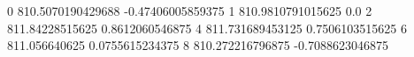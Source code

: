 0 810.5070190429688 -0.47406005859375
1 810.9810791015625 0.0
2 811.84228515625 0.8612060546875
4 811.731689453125 0.7506103515625
6 811.056640625 0.0755615234375
8 810.272216796875 -0.7088623046875
